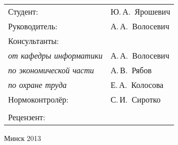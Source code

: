 \begin{titlepage}
\begin{center}
    \begin{tabular}{ p{}p{} }
      Студент: & Ю.\,А.~Ярошевич \\
      Руководитель: & А.\,А.~Волосевич \\
      Консультанты: &\\
      \hspace*{3ex}\emph{от кафедры информатики} & А.\,А.~Волосевич \\
      \hspace*{3ex}\emph{по экономической части} & А.\,В.~Рябов \\
      \hspace*{3ex}\emph{по охране труда} & Е.\,А.~Колосова \\
      Нормоконтролёр: & С.\,И.~Сиротко\\
      & \\
      Рецензент: &
    \end{tabular}
    
    \vfill
    {\normalsize Минск 2013}
  \end{center}
\end{titlepage}
